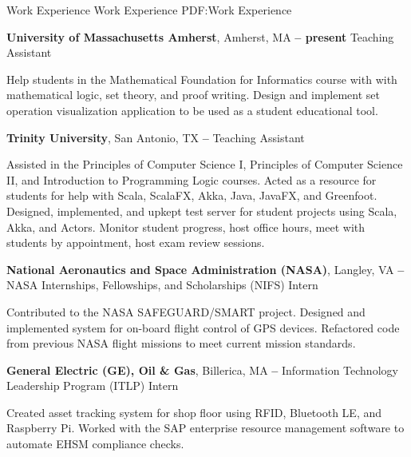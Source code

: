 \Section
{Work Experience}
{Work Experience}
{PDF:Work Experience}

\Entry
\textbf{University of Massachusetts Amherst},
Amherst, MA
\dotfill
\textbf{ -- present}
\SubEntry
\Gap
Teaching Assistant
\begin{Detail}
    \SubBulletItem
    Help students in the Mathematical Foundation for Informatics course with with mathematical logic, set theory, and proof writing.
    \SubBulletItem
    Design and implement set operation visualization application to be used as a student educational tool.
\end{Detail}

\BigGap
\Entry
\textbf{Trinity University},
San Antonio, TX
\dotfill
\textbf{ -- }
\SubEntry
\Gap
Teaching Assistant
\begin{Detail}
    \SubBulletItem
    Assisted in the Principles of Computer Science I, Principles of Computer Science II, and Introduction to Programming Logic courses.
    \SubBulletItem
    Acted as a resource for students for help with Scala, ScalaFX, Akka, Java, JavaFX, and Greenfoot.
    \SubBulletItem
    Designed, implemented, and upkept test server for student projects using Scala, Akka, and Actors.
    \SubBulletItem
    Monitor student progress, host office hours, meet with students by appointment, host exam review sessions.
\end{Detail}

\BigGap
\Entry
\textbf{National Aeronautics and Space Administration (NASA)},
Langley, VA
\dotfill
\textbf{ -- }
\SubEntry
\Gap
NASA Internships, Fellowships, and Scholarships (NIFS) Intern
\begin{Detail}
    \SubBulletItem
    Contributed to the NASA SAFEGUARD/SMART project.
    \SubBulletItem
    Designed and implemented system for on-board flight control of GPS devices.
    \SubBulletItem
    Refactored code from previous NASA flight missions to meet current mission standards.
\end{Detail}

\Entry
\BigGap
\textbf{General Electric (GE), Oil \& Gas},
Billerica, MA
\dotfill
\textbf{ --
}
\SubEntry
\Gap
Information Technology Leadership Program (ITLP) Intern
\begin{Detail}
    \SubBulletItem
    Created asset tracking system for shop floor using RFID, Bluetooth LE, and Raspberry Pi.
    \SubBulletItem
    Worked with the SAP enterprise resource management software to automate EHSM compliance checks.
\end{Detail}
